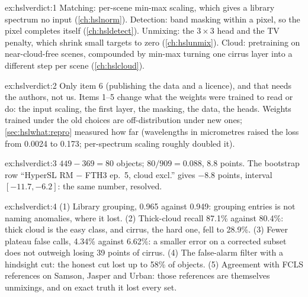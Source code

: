 
\begin{solution}{ex:hslverdict:1}
Matching: per-scene min-max scaling, which gives a library spectrum no input (\cref{ch:hslnorm}). Detection: band masking
within a pixel, so the pixel completes itself (\cref{ch:hsldetect}). Unmixing: the $3\times3$ head and the TV penalty, which
shrink small targets to zero (\cref{ch:hslunmix}). Cloud: pretraining on near-cloud-free scenes, compounded by min-max
turning one cirrus layer into a different step per scene (\cref{ch:hslcloud}).
\end{solution}

\begin{solution}{ex:hslverdict:2}
Only item 6 (publishing the data and a licence), and that needs the authors, not us. Items 1--5 change what the weights
were trained to read or do: the input scaling, the first layer, the masking, the data, the heads. Weights trained under the
old choices are off-distribution under new ones; \cref{sec:hslwhat:repro} measured how far (wavelengths in micrometres raised
the loss from 0.0024 to 0.173; per-spectrum scaling roughly doubled it).
\end{solution}

\begin{solution}{ex:hslverdict:3}
$449-369=80$ objects; $80/909=0.088$, 8.8 points. The bootstrap row ``HyperSL RM $-$ FTH3 ep.\ 5, cloud excl.'' gives
$-8.8$ points, interval $[-11.7,-6.2]$: the same number, resolved.
\end{solution}

\begin{solution}{ex:hslverdict:4}
(1) Library grouping, 0.965 against 0.949: grouping entries is not naming anomalies, where it lost. (2) Thick-cloud recall
87.1\% against 80.4\%: thick cloud is the easy class, and cirrus, the hard one, fell to 28.9\%. (3) Fewer plateau false calls,
4.34\% against 6.62\%: a smaller error on a corrected subset does not outweigh losing 39 points of cirrus. (4) The
false-alarm filter with a hindsight cut: the honest cut lost up to 58\% of objects. (5) Agreement with FCLS references on
Samson, Jasper and Urban: those references are themselves unmixings, and on exact truth it lost every set.
\end{solution}

